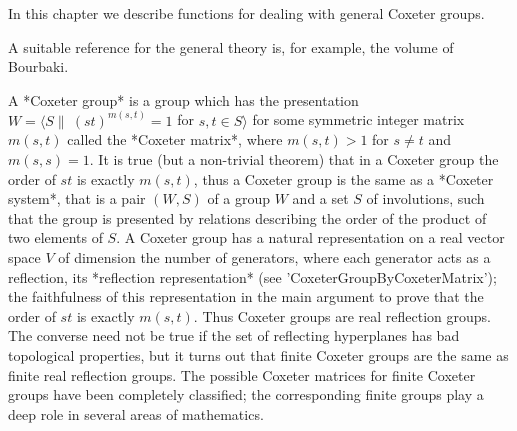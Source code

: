 

In this chapter  we describe functions for dealing  with general Coxeter
groups.

A suitable reference for the general  theory is, for example, the volume
\cite{Bou68} of Bourbaki.

A  *Coxeter group* is a group which  has the presentation $W= \langle S \|\
(st)^{m(s,t)}=1$  for $s,t\in S \rangle $ for some symmetric integer matrix
$m(s,t)$  called the *Coxeter  matrix*, where $m(s,t)>1$  for $s \ne t$ and
$m(s,s)=1$.  It is true (but a non-trivial theorem) that in a Coxeter group
the  order of $st$ is exactly $m(s,t)$, thus a Coxeter group is the same as
a  *Coxeter system*, that is a pair $(W,S)$ of a group $W$ and a set $S$ of
involutions,  such that the group is  presented by relations describing the
order  of the product of two elements of $S$. A Coxeter group has a natural
representation  on  a  real  vector  space  $V$  of dimension the number of
generators,  where  each  generator  acts  as a reflection, its *reflection
representation*  (see  'CoxeterGroupByCoxeterMatrix');  the faithfulness of
this representation in the main argument to prove that the order of $st$ is
exactly  $m(s,t)$.  Thus  Coxeter  groups  are  real reflection groups. The
converse  need not  be true  if the  set of  reflecting hyperplanes has bad
topological properties, but it turns out that finite Coxeter groups are the
same  as finite real  reflection groups. The  possible Coxeter matrices for
finite  Coxeter groups  have been  completely classified; the corresponding
finite groups play a deep role in several areas of mathematics.

